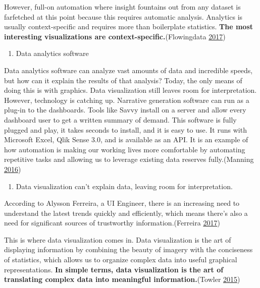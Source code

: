 \documentclass[]{book}
\providecommand{\tightlist}{%
  \setlength{\itemsep}{0pt}\setlength{\parskip}{0pt}}
\theoremstyle{definition}
\theoremstyle{definition}
\theoremstyle{definition}
\theoremstyle{remark}
\begin{document}
However, full-on automation where insight fountains out from any dataset
is farfetched at this point because this requires automatic analysis.
Analytics is usually context-specific and requires more than boilerplate
statistics. \textbf{The most interesting visualizations are
context-specific.}(Flowingdata \protect\hyperlink{ref-auto_viz}{2017})

\begin{enumerate}
\def\labelenumi{\arabic{enumi}.}
\setcounter{enumi}{3}
\tightlist
\item
  Data analytics software
\end{enumerate}

Data analytics software can analyze vast amounts of data and incredible
speeds, but how can it explain the results of that analysis? Today, the
only means of doing this is with graphics. Data visualization still
leaves room for interpretation. However, technology is catching up.
Narrative generation software can run as a plug-in to the dashboards.
Tools like Savvy install on a server and allow every dashboard user to
get a written summary of demand. This software is fully plugged and
play, it takes seconds to install, and it is easy to use. It runs with
Microsoft Excel, Qlik Sense 3.0, and is available as an API. It is an
example of how automation is making our working lives more comfortable
by automating repetitive tasks and allowing us to leverage existing data
reserves fully.(Manning \protect\hyperlink{ref-work_place}{2016})

\begin{enumerate}
\def\labelenumi{\arabic{enumi}.}
\setcounter{enumi}{4}
\tightlist
\item
  Data visualization can't explain data, leaving room for
  interpretation.
\end{enumerate}

According to Alysson Ferreira, a UI Engineer, there is an increasing
need to understand the latest trends quickly and efficiently, which
means there's also a need for significant sources of trustworthy
information.(Ferreira \protect\hyperlink{ref-UI_engineer}{2017})

This is where data visualization comes in. Data visualization is the art
of displaying information by combining the beauty of imagery with the
conciseness of statistics, which allows us to organize complex data into
useful graphical representations. \textbf{In simple terms, data
visualization is the art of translating complex data into meaningful
information.}(Towler \protect\hyperlink{ref-future_viz}{2015})
\end{document}
